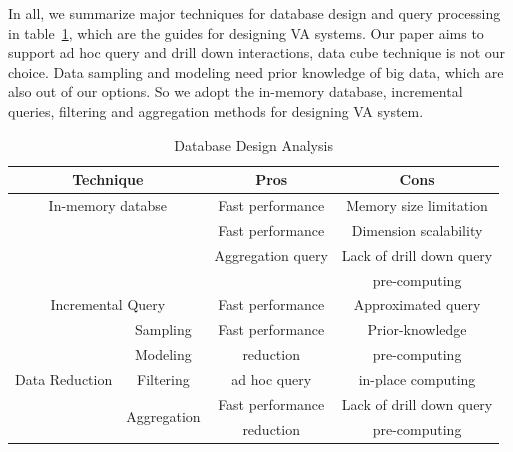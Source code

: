 \documentclass[journal]{vgtc}                %
\begin{document}
{In all, we summarize major techniques for database design and  query processing in table~\ref{tab:database}, which are the guides for designing VA systems. Our paper aims to support ad hoc query and drill down interactions, data cube technique is not our choice. Data sampling and modeling need prior knowledge of big data, which are also out of our options. So we adopt the in-memory database, incremental queries, filtering and aggregation methods for designing VA system. 




\begin{table}[ht]
	\small
	\caption{Database Design Analysis}
	\begin{center}
		\begin{tabular}{|cc|c|c|}
			\hline
			\multicolumn{2}{|c|}{\textbf{Technique}} & \textbf{Pros} & \textbf{Cons} \\
			\hline
				\multicolumn{2}{|c|}{In-memory databse} & Fast performance & Memory size limitation\\
			\hline
			
		  	\multicolumn{2}{|c|}{	\multirow{3}{*}{Data cube} }& Fast performance  & Dimension scalability\\
			& & Aggregation query  & Lack of drill down query \\
			& & & pre-computing\\
			\hline
			
			
				
			\multicolumn{2}{|c|}{Incremental Query} & Fast performance & Approximated query\\
			\hline

			
			 \multicolumn{1}{|c|}{\multirow{5}{*}{Data Reduction}}& Sampling & Fast performance  & Prior-knowledge\\ 
			& \multicolumn{1}{|c|}{Modeling}  & reduction & pre-computing \\  
				\cline{2-4}
			& \multicolumn{1}{|c|}{Filtering} & ad hoc query & in-place computing\\ 
			\cline{2-4}
					& \multicolumn{1}{|c|}{\multirow{2}{*}{Aggregation}} & Fast performance & Lack of drill down query\\
						& \multicolumn{1}{|c|}{} & reduction  & pre-computing\\
			\hline
			
			
			\hline
		\end{tabular}
	\end{center}
	\label{tab:database}
\end{table}


}
\end{document}
